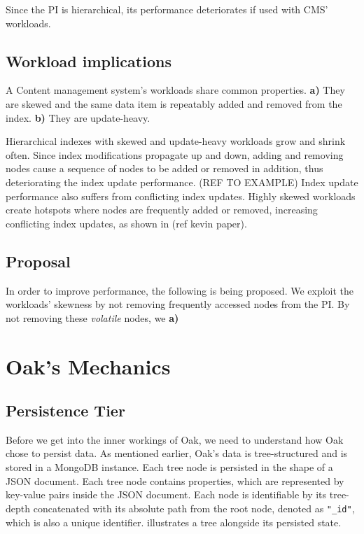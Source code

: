 \documentclass[abstracton,12pt]{scrreprt}
\begin{document}
Since the PI is hierarchical, its performance deteriorates if used with CMS' workloads.

\section{Workload implications}

A Content management system's workloads share common properties.
\textbf{a)} They are skewed and the same data item is repeatably added and removed from the index.
\textbf{b)} They are update-heavy.

Hierarchical indexes with skewed and update-heavy workloads grow and shrink often.
Since index modifications propagate up and down, adding and removing nodes cause a sequence of nodes to be added or removed in addition, thus deteriorating the index update performance. (REF TO EXAMPLE)
Index update performance also suffers from conflicting index updates.
Highly skewed workloads create hotspots where nodes are frequently added or removed, increasing conflicting index updates, as shown in (ref kevin paper).

\section{Proposal}

In order to improve performance, the following is being proposed.
We exploit the workloads' skewness by not removing frequently accessed nodes from the PI.
By not removing these \textit{volatile} nodes, we \textbf{a)} 

\chapter{Oak's Mechanics}

\section{Persistence Tier}

Before we get into the inner workings of Oak, we need to understand how Oak chose to persist data.
As mentioned earlier, Oak's data is tree-structured and is stored in a MongoDB instance.
Each tree node is persisted in the shape of a JSON document.
Each tree node contains properties, which are represented by key-value pairs inside the JSON document.
Each node is identifiable by its tree-depth concatenated with its absolute path from the root node, denoted as \texttt{"\_id"}, which is also a unique identifier.
 illustrates a tree alongside its persisted state.
\end{document}
